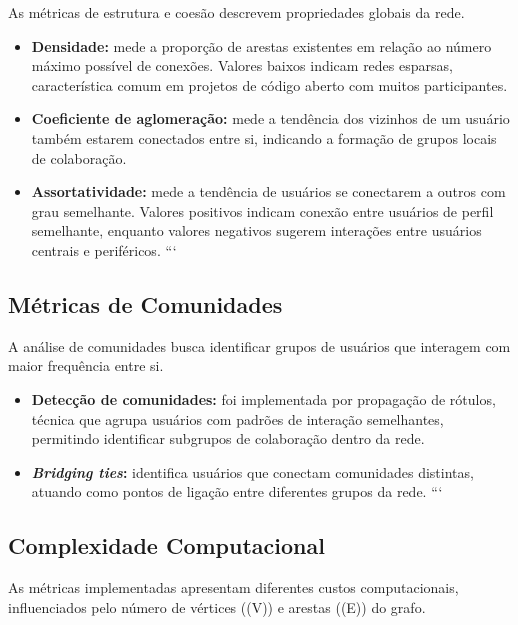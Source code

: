 \documentclass[12pt]{article}
\begin{document}
As métricas de estrutura e coesão descrevem propriedades globais da rede.

\begin{itemize}

\item \textbf{Densidade:} mede a proporção de arestas existentes em relação ao número máximo possível de conexões. Valores baixos indicam redes esparsas, característica comum em projetos de código aberto com muitos participantes.

\item \textbf{Coeficiente de aglomeração:} mede a tendência dos vizinhos de um usuário também estarem conectados entre si, indicando a formação de grupos locais de colaboração.

\item \textbf{Assortatividade:} mede a tendência de usuários se conectarem a outros com grau semelhante. Valores positivos indicam conexão entre usuários de perfil semelhante, enquanto valores negativos sugerem interações entre usuários centrais e periféricos.
```

\end{itemize}

\subsection{Métricas de Comunidades}

A análise de comunidades busca identificar grupos de usuários que interagem com maior frequência entre si.

\begin{itemize}

\item \textbf{Detecção de comunidades:} foi implementada por propagação de rótulos, técnica que agrupa usuários com padrões de interação semelhantes, permitindo identificar subgrupos de colaboração dentro da rede.

\item \textbf{\textit{Bridging ties}:} identifica usuários que conectam comunidades distintas, atuando como pontos de ligação entre diferentes grupos da rede.
```

\end{itemize}

\subsection{Complexidade Computacional}

As métricas implementadas apresentam diferentes custos computacionais, influenciados pelo número de vértices ((V)) e arestas ((E)) do grafo.
\end{document}
